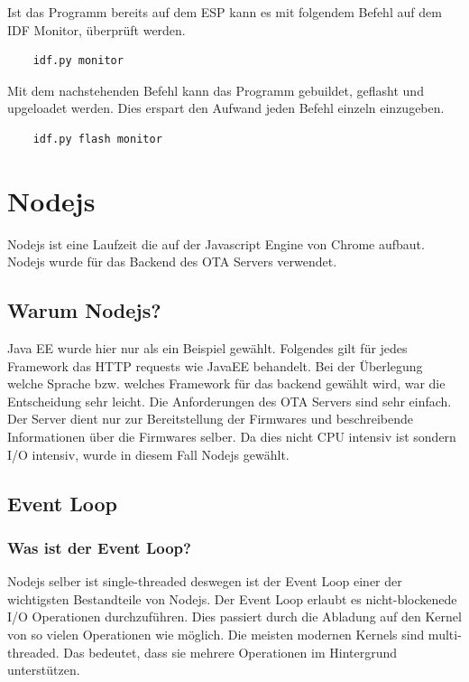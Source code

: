 Ist das Programm bereits auf dem ESP kann es mit folgendem Befehl auf dem IDF Monitor, überprüft werden.

\begin{verbatim}
    idf.py monitor
\end{verbatim}

Mit dem nachstehenden Befehl kann das Programm gebuildet, geflasht und upgeloadet werden. Dies erspart den Aufwand jeden Befehl einzeln einzugeben.

\begin{verbatim}
    idf.py flash monitor
\end{verbatim}

\section{Nodejs}\label{sec:nodejs}

Nodejs ist eine Laufzeit die auf der Javascript Engine von Chrome aufbaut. Nodejs wurde für das Backend des OTA Servers verwendet.

\subsection{Warum Nodejs?}

Java EE wurde hier nur als ein Beispiel gewählt. Folgendes gilt für jedes Framework das HTTP requests wie JavaEE behandelt. 
Bei der Überlegung welche Sprache bzw. welches Framework für das backend gewählt wird, war die Entscheidung sehr leicht.
Die Anforderungen des OTA Servers sind sehr einfach. Der Server dient nur zur Bereitstellung der Firmwares und beschreibende Informationen über die Firmwares selber.
Da dies nicht CPU intensiv ist sondern I/O intensiv, wurde in diesem Fall Nodejs gewählt.

\subsection{Event Loop}

\subsubsection{Was ist der Event Loop?}

Nodejs selber ist single-threaded deswegen ist der Event Loop einer der wichtigsten Bestandteile von Nodejs.
Der Event Loop erlaubt es nicht-blockenede I/O Operationen durchzuführen. Dies passiert durch die Abladung auf den Kernel von so vielen Operationen wie möglich.
\newline
\newline
Die meisten modernen Kernels sind multi-threaded. Das bedeutet, dass sie mehrere Operationen im Hintergrund unterstützen.

